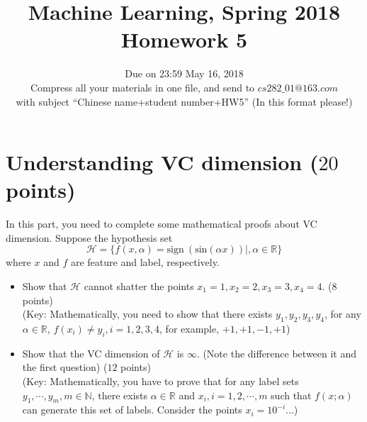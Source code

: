 \documentclass[10pt]{article}
\newcommand{\Ne}{\mathbb{N}}
\renewcommand{\Re}{{\mathbb{R}}}
\begin{document}
	
\title{Machine Learning, Spring 2018\\Homework 5}
\date{Due on 23:59 May 16, 2018\\Compress all your materials in {\color{red}one} file, and send to $cs282\_01@163.com$ \\with subject {\color{red}``Chinese name+student number+HW5'' (In this format please!)}}
\maketitle


\section*{Understanding VC dimension ($20$ points)} 

In this part, you need to complete some mathematical proofs about VC dimension. Suppose the hypothesis set
\begin{equation*}
\mathcal{H} = \{f(x, \alpha) = \mathrm{sign} \ ( \mathrm{sin}(\alpha x))|, \alpha \in \Re \}
\end{equation*}
where $x$ and $f$ are feature and label, respectively.
\begin{itemize}
	\item Show that $\mathcal{H}$ cannot shatter the points $x_1 = 1, x_2 = 2, x_3 = 3, x_4 = 4$. ($8$ points) \\
	
	
	(Key: Mathematically, you need to show that there exists $y_1, y_2, y_3, y_4$, for any $\alpha \in \Re$, $f(x_i) \neq y_i, i = 1,2,3,4$, for example, $+1, +1, -1, +1$)
	
	\item Show that the VC dimension of $\mathcal{H}$ is $\infty$. (Note the difference between it and the first question) ($12$ points) \\
	
	(Key: Mathematically, you have to prove that for any label sets ${y_1 , \cdots , y_m}, m \in \Ne $, there exists $\alpha \in \Re$ and $x_i, i = 1,2,\cdots,m$
	such that $f(x; \alpha)$ can generate this set of labels. Consider the points $x_i = 10^{-i}$...)
	
\end{itemize} 
\end{document}
